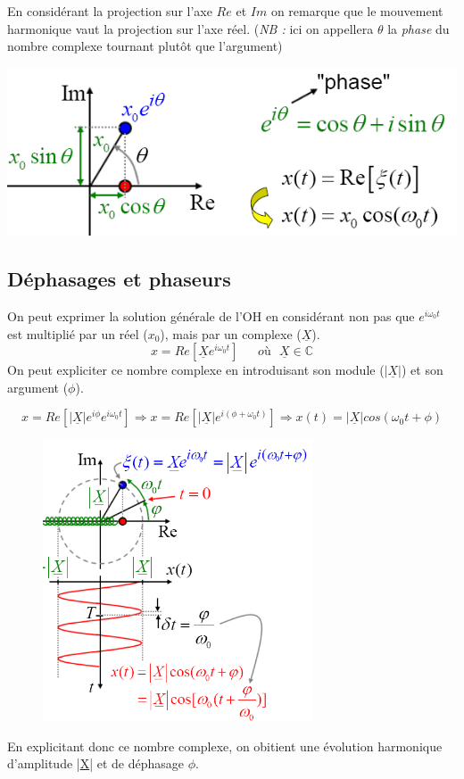 \documentclass	[11pt, a4paper, openany]{book}
\begin{document}
En considérant la projection sur l'axe $Re$ et $Im$ on remarque que le mouvement harmonique vaut la projection sur l'axe réel. (\textit{NB :} ici on appellera $\theta$ la \textit{phase} du nombre complexe tournant plutôt que l'argument)
\begin{center}
\includegraphics[scale=0.45]{oo/image12.png}
\end{center}

\subsection{Déphasages et phaseurs}
On peut exprimer la solution générale de l'OH en considérant non pas que $e^{i\omega_0 t}$ est multiplié par un réel ($x_0$), mais par un complexe ($\underline{X}$).
\begin{equation}
x = Re\left[\underline{X}e^{i\omega_0 t}\right]\ \ \ \ \ \ \ où\ \ \ \underline{X} \in \mathbb{C}
\end{equation}
On peut expliciter ce nombre complexe en introduisant son module ($|\underline{X}|$) et son argument ($\phi$).

\begin{equation}
x = Re\left[|\underline{X}|e^{i\phi}e^{i\omega_0t}\right] \Rightarrow x = Re\left[|\underline{X}|e^{i(\phi + \omega_0 t)}\right] \Rightarrow x(t) = |\underline{X}|cos(\omega_0 t + \phi)
\end{equation}

\begin{figure}
\includegraphics[width=8cm]{oo/image13.png}
\end{figure}
En explicitant donc ce nombre complexe, on obitient une évolution harmonique d'amplitude |\underline{X}| et de déphasage $\phi$.\\
\end{document}
